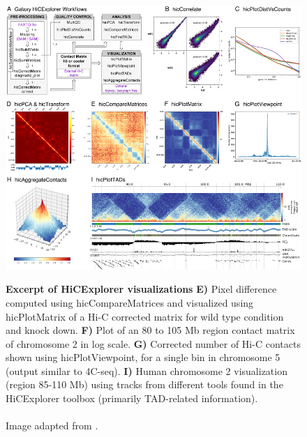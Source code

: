 
\begin{figure}[!htbp]
\begin{centering}
    {\includegraphics[scale=3.8,trim=37 0 0 45,clip]{figures/background/HiCExplorer.jpg}}
    \caption[Excerpt of HiCExplorer visualizations]
    {
        \textbf{Excerpt of HiCExplorer visualizations}
        \textbf{E)} Pixel difference computed using hicCompareMatrices and
        visualized using hicPlotMatrix of a Hi-C corrected matrix for wild type
        condition and knock down.
        \textbf{F)} Plot of an 80 to 105 Mb region contact matrix of chromosome 2 in log scale.
        \textbf{G)} Corrected number of Hi-C contacts shown using
        hicPlotViewpoint, for a single bin in chromosome 5 (output similar to
        4C-seq).
        \textbf{I)} Human chromosome 2 visualization (region 85-110 Mb) using
        tracks from different tools found in the HiCExplorer toolbox (primarily
        TAD-related information). \\
        \\Image adapted from \cite{wolff2018galaxy}.}
    \label{fig:comparison3C}\label{fig:HiCExplorer}
\end{centering}
\end{figure}



